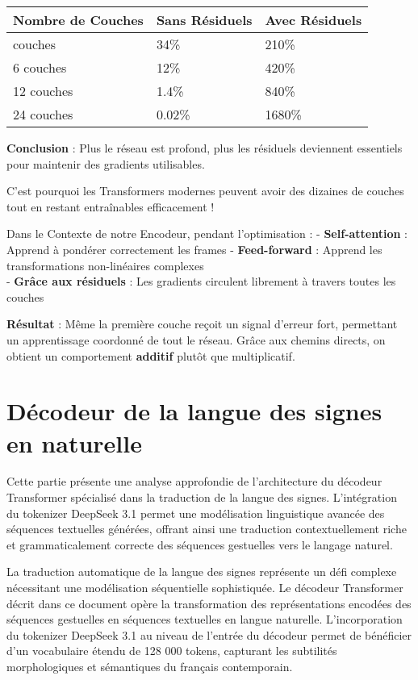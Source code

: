 \documentclass[12pt]{article}
\begin{document}
\begin{longtable}[]{@{}lll@{}}
\toprule\noalign{}
Nombre de Couches & Sans Résiduels & Avec Résiduels \\
\midrule\noalign{}
\endhead
\bottomrule\noalign{}
\endlastfoot
3 couches & 34\% & 210\% \\
6 couches & 12\% & 420\% \\
12 couches & 1.4\% & 840\% \\
24 couches & 0.02\% & 1680\% \\
\end{longtable}

\textbf{Conclusion} : Plus le réseau est profond, plus les résiduels
deviennent essentiels pour maintenir des gradients utilisables.

C'est pourquoi les Transformers modernes peuvent avoir des dizaines de
couches tout en restant entraînables efficacement !

Dans le Contexte de notre Encodeur, pendant l'optimisation : -
\textbf{Self-attention} : Apprend à pondérer correctement les frames -
\textbf{Feed-forward} : Apprend les transformations non-linéaires
complexes\\
- \textbf{Grâce aux résiduels} : Les gradients circulent librement à
travers toutes les couches

\textbf{Résultat} : Même la première couche reçoit un signal d'erreur
fort, permettant un apprentissage coordonné de tout le réseau. Grâce aux
chemins directs, on obtient un comportement \textbf{additif} plutôt que
multiplicatif.

    \section{Décodeur de la langue des signes en
naturelle}\label{duxe9codeur-de-la-langue-des-signes-en-naturelle}

    Cette partie présente une analyse approfondie de l'architecture du
décodeur Transformer spécialisé dans la traduction de la langue des
signes. L'intégration du tokenizer DeepSeek 3.1 permet une modélisation
linguistique avancée des séquences textuelles générées, offrant ainsi
une traduction contextuellement riche et grammaticalement correcte des
séquences gestuelles vers le langage naturel.

La traduction automatique de la langue des signes représente un défi
complexe nécessitant une modélisation séquentielle sophistiquée. Le
décodeur Transformer décrit dans ce document opère la transformation des
représentations encodées des séquences gestuelles en séquences
textuelles en langue naturelle. L'incorporation du tokenizer DeepSeek
3.1 au niveau de l'entrée du décodeur permet de bénéficier d'un
vocabulaire étendu de 128 000 tokens, capturant les subtilités
morphologiques et sémantiques du français contemporain.
\end{document}
